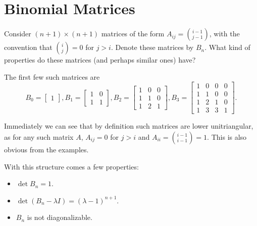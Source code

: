 \documentclass[a4paper, 12pt]{article}
\begin{document}
\section*{Binomial Matrices}

\begin{sidebox}
    \begin{idea}
        Consider \( (n + 1) \times (n + 1) \) matrices of the form \( A_{ij} = \binom{i - 1}{j - 1} \), with the convention that \( \binom{i}{j} = 0 \) for \( j > i \). Denote these matrices by \( B_n \). What kind of properties do these matrices (and perhaps similar ones) have?
    \end{idea}
\end{sidebox}

\begin{example}
    The first few such matrices are
    \[
        B_0 = \begin{bmatrix}
            1
        \end{bmatrix},
        B_1 = \begin{bmatrix}
            1 & 0 \\
            1 & 1
        \end{bmatrix},
        B_2 = \begin{bmatrix}
            1 & 0 & 0 \\
            1 & 1 & 0 \\
            1 & 2 & 1
        \end{bmatrix},
        B_3 = \begin{bmatrix}
            1 & 0 & 0 & 0 \\
            1 & 1 & 0 & 0 \\
            1 & 2 & 1 & 0 \\
            1 & 3 & 3 & 1
        \end{bmatrix}
    .\]
\end{example}

\begin{observation}
    Immediately we can see that by definition such matrices are lower unitriangular, as for any such matrix \( A \), \( A_{ij} = 0 \) for \( j > i \) and \( A_{ii} = \binom{i - 1}{i - 1} = 1 \). This is also obvious from the examples.

    With this structure comes a few properties:
    \begin{itemize}
        \item \( \det B_n = 1 \).
        \item \( \det (B_n - \lambda I) = (\lambda - 1)^{n + 1} \).
        \item \( B_n \) is not diagonalizable.
    \end{itemize}
\end{observation}
\end{document}
